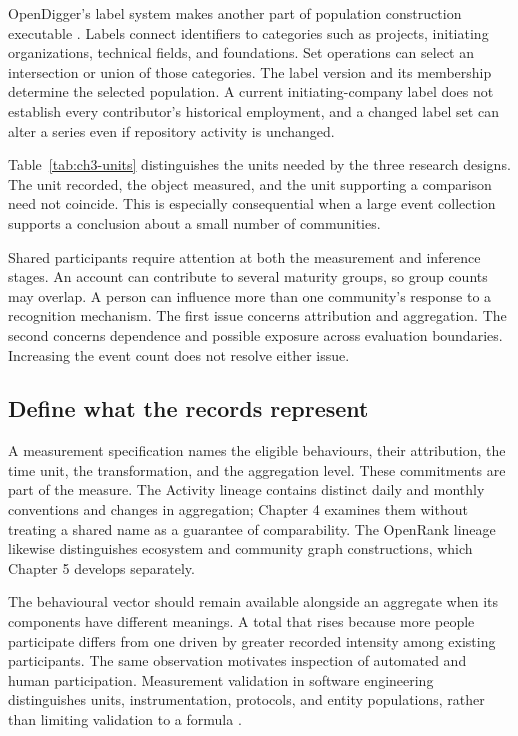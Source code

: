 OpenDigger's label system makes another part of population construction executable \citep[Section 3.3 and Appendix A.1]{wang2026digger}. Labels connect identifiers to categories such as projects, initiating organizations, technical fields, and foundations. Set operations can select an intersection or union of those categories. The label version and its membership determine the selected population. A current initiating-company label does not establish every contributor's historical employment, and a changed label set can alter a series even if repository activity is unchanged.

Table~\ref{tab:ch3-units} distinguishes the units needed by the three research designs. The unit recorded, the object measured, and the unit supporting a comparison need not coincide. This is especially consequential when a large event collection supports a conclusion about a small number of communities.



Shared participants require attention at both the measurement and inference stages. An account can contribute to several maturity groups, so group counts may overlap. A person can influence more than one community's response to a recognition mechanism. The first issue concerns attribution and aggregation. The second concerns dependence and possible exposure across evaluation boundaries. Increasing the event count does not resolve either issue.

\subsection{Define what the records represent}
A measurement specification names the eligible behaviours, their attribution, the time unit, the transformation, and the aggregation level. These commitments are part of the measure. The Activity lineage contains distinct daily and monthly conventions and changes in aggregation; Chapter 4 examines them without treating a shared name as a guarantee of comparability. The OpenRank lineage likewise distinguishes ecosystem and community graph constructions, which Chapter 5 develops separately.

The behavioural vector should remain available alongside an aggregate when its components have different meanings. A total that rises because more people participate differs from one driven by greater recorded intensity among existing participants. The same observation motivates inspection of automated and human participation. Measurement validation in software engineering distinguishes units, instrumentation, protocols, and entity populations, rather than limiting validation to a formula \citep{kitchenham1995}.

